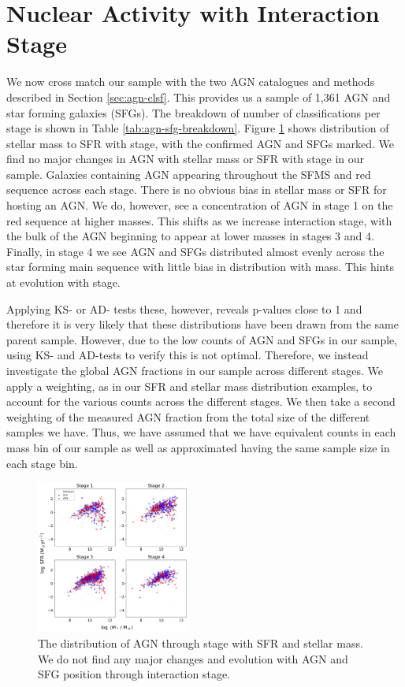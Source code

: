 \section{Nuclear Activity with Interaction Stage}\label{results:AGN_stage}
\noindent We now cross match our sample with the two AGN catalogues and methods described in Section \ref{sec:agn-clsf}. This provides us a sample of 1,361 AGN and star forming galaxies (SFGs). The breakdown of number of classifications per stage is shown in Table \ref{tab:agn-sfg-breakdown}. Figure \ref{fig:agn-stage} shows distribution of stellar mass to SFR with stage, with the confirmed AGN and SFGs marked. We find no major changes in AGN with stellar mass or SFR with stage in our sample. Galaxies containing AGN appearing throughout the SFMS and red sequence across each stage. There is no obvious bias in stellar mass or SFR for hosting an AGN. We do, however, see a concentration of AGN in stage 1 on the red sequence at higher masses. This shifts as we increase interaction stage, with the bulk of the AGN beginning to appear at lower masses in stages 3 and 4. Finally, in stage 4 we see AGN and SFGs distributed almost evenly across the star forming main sequence with little bias in distribution with mass. This hints at evolution with stage.

Applying KS- or AD- tests these, however, reveals p-values close to 1 and therefore it is very likely that these distributions have been drawn from the same parent sample. However, due to the low counts of AGN and SFGs in our sample, using KS- and AD-tests to verify this is not optimal. Therefore, we instead investigate the global AGN fractions in our sample across different stages. We apply a weighting, as in our SFR and stellar mass distribution examples, to account for the various counts across the different stages. We then take a second weighting of the measured AGN fraction from the total size of the different samples we have. Thus, we have assumed that we have equivalent counts in each mass bin of our sample as well as approximated having the same sample size in each stage bin.

\begin{figure}
    \centering
    \includegraphics[width=0.45\textwidth]{Chapter3/figures/agn-stage-dist.pdf}
    \caption{The distribution of AGN through stage with SFR and stellar mass. We do not find any major changes and evolution with AGN and SFG position through interaction stage. }
    \label{fig:agn-stage}
\end{figure}

